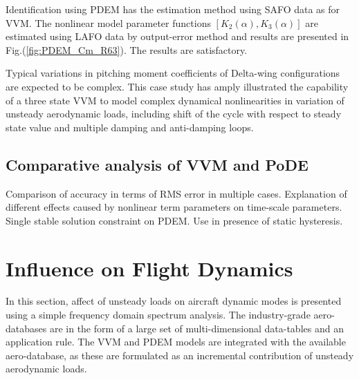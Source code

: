 \documentclass{AIAA}
\begin{document}
Identification using PDEM has the estimation method using SAFO data as for VVM. The nonlinear model parameter functions $[K_{2}(\alpha), K_{3}(\alpha)]$ are estimated using LAFO data by output-error method and results are presented in Fig.(\ref{fig:PDEM_Cm_R63}). The results are satisfactory.


Typical variations in pitching moment coefficients of Delta-wing configurations are expected to be complex. This case study has amply illustrated the capability of a three state VVM to model complex dynamical nonlinearities in variation of unsteady aerodynamic loads, including shift of the cycle with respect to steady state value and multiple damping and anti-damping loops.



\subsection{Comparative analysis of VVM and PoDE}
Comparison of accuracy in terms of RMS error in multiple cases. Explanation of different effects caused by nonlinear term parameters on time-scale parameters. Single stable solution constraint on PDEM. Use in presence of static hysteresis.

\section{Influence on Flight Dynamics}
In this section, affect of unsteady loads on aircraft dynamic modes is presented using a simple frequency domain spectrum analysis. The industry-grade aero-databases are in the form of a large set of multi-dimensional data-tables and an application rule. The VVM and PDEM models are integrated with the available aero-database, as these are formulated as an incremental contribution of unsteady aerodynamic loads.
\end{document}
